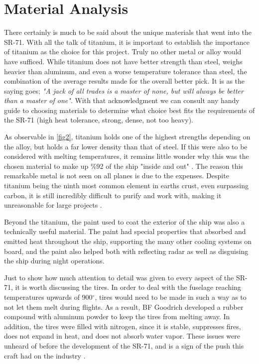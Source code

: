\documentclass[conf]{new-aiaa}
\begin{document}
\section{Material Analysis}
There certainly is much to be said about the unique materials that went into the SR-71. With all the talk of titanium, it is important to establish the importance of titanium as the choice for this project. Truly no other metal or alloy would have sufficed. While titanium does not have better strength than steel, weighs heavier than aluminum, and even a worse temperature tolerance than steel, the combination of the average results made for the overall better pick. It is as the saying goes; \textit{"A jack of all trades is a master of none, but will always be better than a master of one"}. With that acknowledgment we can consult any handy guide to choosing materials to determine what choice best fits the requirements of the SR-71 (high heat tolerance, strong, dense, not too heavy).\par
As observable in \ref{fig2}, titanium holds one of the highest strengths depending on the alloy, but holds a far lower density than that of steel. If this were also to be considered with melting temperatures, it remains little wonder why this was the chosen material to make up \%92 of the ship "inside and out" \cite{BBC}. The reason this remarkable metal is not seen on all planes is due to the expenses. Despite titanium being the ninth most common element in earths crust, even surpassing carbon, it is still incredibly difficult to purify and work with, making it unreasonable for large projects \cite{Titanium}. \par
Beyond the titanium, the paint used to coat the exterior of the ship was also a technically useful material. The paint had special properties that absorbed and emitted heat throughout the ship, supporting the many other cooling systems on board, and the paint also helped both with reflecting radar as well as disguising the ship during night operations.\par
Just to show how much attention to detail was given to every aspect of the SR-71, it is worth discussing the tires. In order to deal with the fuselage reaching temperatures upwards of 900$^{\circ}$, tires would need to be made in such a way as to not let them melt during flights. As a result, BF Goodrich developed a rubber compound with aluminum powder to keep the tires from melting away. In addition, the tires were filled with nitrogen, since it is stable, suppresses fires, does not expand in heat, and does not absorb water vapor. These issues were unheard of before the development of the SR-71, and is a sign of the push this craft had on the industry \cite{boom}.
\end{document}
